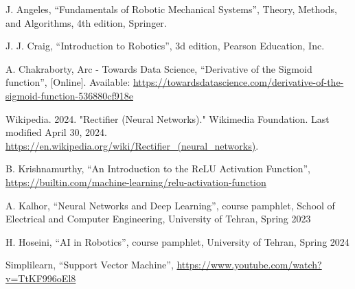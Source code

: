 \documentclass[conference]{IEEEtran}
\begin{document}
\begin{thebibliography}{00}
     J. Angeles, ``Fundamentals of Robotic Mechanical Systems'', Theory, Methods, and Algorithms, 4th edition, Springer.

     J. J. Craig, ``Introduction to Robotics'', 3d edition, Pearson Education, Inc.

     A. Chakraborty, Arc - Towards Data Science, ``Derivative of the Sigmoid function'', [Online]. Available: \url{https://towardsdatascience.com/derivative-of-the-sigmoid-function-536880cf918e}

     Wikipedia. 2024. "Rectifier (Neural Networks)." Wikimedia Foundation. Last modified April 30, 2024. \url{https://en.wikipedia.org/wiki/Rectifier_(neural_networks)}.

     B. Krishnamurthy, ``An Introduction to the ReLU Activation Function'', \url{https://builtin.com/machine-learning/relu-activation-function}

     A. Kalhor, ``Neural Networks and Deep Learning'', course pamphlet, School of Electrical and Computer Engineering, University of Tehran, Spring 2023

     H. Hoseini, ``AI in Robotics'', course pamphlet, University of Tehran, Spring 2024

     Simplilearn, ``Support Vector Machine'', \url{https://www.youtube.com/watch?v=TtKF996oEl8}
\end{thebibliography}
\end{document}
